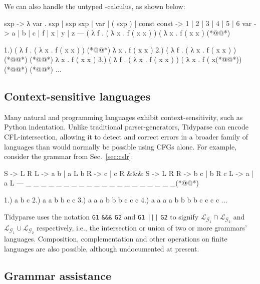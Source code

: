 \documentclass[sigplan,nonacm]{acmart}\settopmatter{printfolios=false,printccs=false,printacmref=false}
\begin{document}
\noindent We can also handle the untyped \lambda-calculus, as shown below:

\begin{tidyinput}
sxp -> λ var . sxp | sxp sxp | var | ( sxp ) | const
const -> 1 | 2 | 3 | 4 | 5 | 6
var -> a | b | c | f | x | y | z
---
( λ f . ( λ x . f ( x x ) ) ( λ x . f ( x x ) (*@\caret{ }@*)
\end{tidyinput}
\begin{tidyoutput}
1.) ( λ f . ( λ x . f ( x x ) ) (*@\hlorange{)}@*) λ x . f ( x x )
2.) ( λ f . ( λ x . f ( x x ) ) (*@@*) (*@\hlgreen{)}@*) λ x . f ( x x )
3.) ( λ f . ( λ x . f ( x x ) ) ( λ x . f ( x(*@\hlred{ }@*)) (*@\hlgreen{)}@*) (*@\hlgreen{)}@*)
...
\end{tidyoutput}

\subsection{Context-sensitive languages}

Many natural and programming languages exhibit context-sensitivity, such as Python indentation. Unlike traditional parser-generators, Tidyparse can encode CFL-intersection, allowing it to detect and correct errors in a broader family of languages than would normally be possible using CFGs alone. For example, consider the grammar from Sec.~\ref{sec:cslr}:

\begin{tidyinput}
S -> L R    L -> a b | a L b    R -> c | c R
&&&
S -> L R    R -> b c | b R c    L -> a | a L
---
_ _ _ _ _ _ _ _ _ _ _ _ _ _ _ _ _ _ _ _(*@\caret{ }@*)
\end{tidyinput}
\begin{tidyoutput}
1.) a b c
2.) a a b b c c
3.) a a a b b b c c c
4.) a a a a b b b b c c c c
...
\end{tidyoutput}

\noindent Tidyparse uses the notation \texttt{G1} {\color{blue}\texttt{\&\&\&}} \texttt{G2} and \texttt{G1} {\color{blue}\texttt{|||}} \texttt{G2} to signify $\mathcal{L}_{\mathcal{G}_1}\cap\mathcal{L}_{\mathcal{G}_2}$ and $\mathcal{L}_{\mathcal{G}_1}\cup\mathcal{L}_{\mathcal{G}_2}$ respectively, i.e., the intersection or union of two or more grammars' languages. {Composition}, complementation and other operations on finite languages are also possible, although undocumented at present.

\subsection{Grammar assistance}
\end{document}
